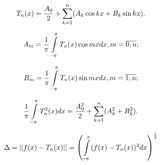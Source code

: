 
\begin{col-answer-preambule}
\end{col-answer-preambule}

\begin{equation}
  \label{eq:lecture06-07}
  T_n(x) = \dfrac{A_0}{2} + \sum\limits_{k = 1}^n(A_k\cos kx + B_k\sin kx).
\end{equation}

\begin{equation}
  \label{eq:lecture06-08}
  A_m = \dfrac{1}{\pi}\int\limits_{-\pi}^{\pi}T_n(x)\cos mx dx, m = \overline{0, n};
\end{equation}

\begin{equation}
  \label{eq:lecture06-09}
  B_m = \dfrac{1}{\pi}\int\limits_{-\pi}^{\pi}T_n(x)\sin mx dx, m = \overline{1, n};
\end{equation}

\begin{equation}
  \label{eq:lecture06-10}
  \dfrac{1}{\pi}\int\limits_{-\pi}^{\pi}T_n^2(x)dx = \dfrac{A_0^2}{2} + \sum\limits_{k = 1}^n(A_k^2 + B_k^2).
\end{equation}

\begin{equation}
  \Delta = \left\lvert\left\lvert f(x) - T_n(x)\right\rvert\right\rvert = \left( \int\limits_{-\pi}^{\pi}(f(x) - T_n(x))^2dx \right)^{\frac{1}{2}}
  \label{eq:lecture06-11}
\end{equation}

